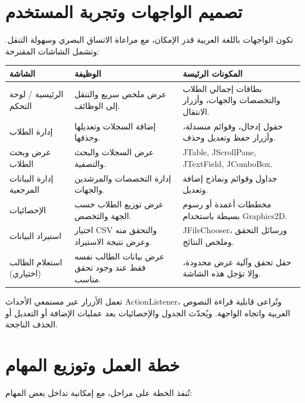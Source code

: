 \documentclass[12pt,a4paper]{article}
\begin{document}
\section{تصميم الواجهات وتجربة المستخدم}
تكون الواجهات باللغة العربية قدر الإمكان، مع مراعاة الاتساق البصري وسهولة التنقل. وتشمل الشاشات المقترحة:

\begin{tabularx}{\textwidth}{|p{3cm}|Y|Y|}
\hline
\textbf{الشاشة} & \textbf{الوظيفة} & \textbf{المكونات الرئيسة}\\ \hline
الرئيسية / لوحة التحكم & عرض ملخص سريع والتنقل إلى الوظائف. & بطاقات إجمالي الطلاب والتخصصات والجهات، وأزرار الانتقال.\\ \hline
إدارة الطلاب & إضافة السجلات وتعديلها وحذفها. & حقول إدخال، وقوائم منسدلة، وأزرار حفظ وتعديل وحذف.\\ \hline
عرض وبحث الطلاب & عرض السجلات والبحث والتصفية. & \textenglish{JTable, JScrollPane, JTextField, JComboBox}.\\ \hline
إدارة البيانات المرجعية & إدارة التخصصات والمرشدين والجهات. & جداول وقوائم ونماذج إضافة وتعديل.\\ \hline
الإحصائيات & عرض توزيع الطلاب حسب الجهة والتخصص. & مخططات أعمدة أو رسوم بسيطة باستخدام \textenglish{Graphics2D}.\\ \hline
استيراد البيانات & اختيار CSV والتحقق منه وعرض نتيجة الاستيراد. & \textenglish{JFileChooser}، ورسائل التحقق وملخص النتائج.\\ \hline
استعلام الطالب (اختياري) & عرض بيانات الطالب نفسه فقط عند وجود تحقق مناسب. & حقل تحقق وآلية عرض محدودة، وإلا تؤجل هذه الشاشة.\\ \hline
\end{tabularx}

تعمل الأزرار عبر مستمعي الأحداث \textenglish{ActionListener}، وتُراعى قابلية قراءة النصوص العربية واتجاه الواجهة. ويُحدّث الجدول والإحصائيات بعد عمليات الإضافة أو التعديل أو الحذف الناجحة.

\section{خطة العمل وتوزيع المهام}
تُنفذ الخطة على مراحل، مع إمكانية تداخل بعض المهام:
\end{document}
